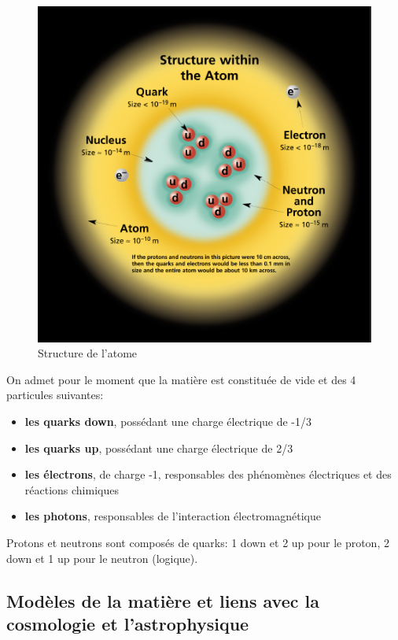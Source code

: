 \begin{figure}[ht]
    \centering
    \includegraphics[scale=0.45]{Images1/atome.png}
    \caption{Structure de l'atome}
    \label{fig:struct_atome}
\end{figure}
On admet pour le moment que la matière est constituée de vide et des 4 particules suivantes:

\begin{itemize}
    \item \textbf{les quarks down}, possédant une charge électrique de -1/3
    \item \textbf{les quarks up}, possédant une charge électrique de 2/3
    \item \textbf{les électrons}, de charge -1, responsables des phénomènes électriques et des réactions chimiques
    \item \textbf{les photons}, responsables de l'interaction électromagnétique
\end{itemize}
Protons et neutrons sont composés de quarks: 1 down et 2 up pour le proton, 2 down et 1 up pour le neutron (logique).

\subsection{Modèles de la matière et liens avec la cosmologie et l'astrophysique}

